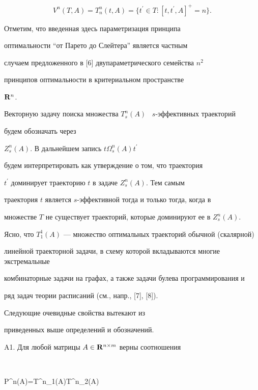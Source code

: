 $$


V^n(T,A)=T^n_n(t,A)=\{t^{\prime}\in T :[t,t^{\prime},A]^+=n\}.


$$





Отметим, что введенная здесь параметризация принципа


оптимальности ``от Парето до Слейтера'' является частным


случаем предложенного в [6] двупараметрического семейства $n^2$


принципов оптимальности в критериальном пространстве


$\bold{R}^n$.





Векторную задачу поиска множества $T^n_s(A)$ \ $s$-эффективных траекторий


будем обозначать через


$Z^n_s(A)$. В дальнейшем запись $t \Omega^n_s(A) t^{\prime}$


будем интерпретировать как утверждение о том, что траектория


$t^{\prime}$ доминирует траекторию $t$ в задаче $Z^n_s(A)$. Тем самым


траектория $t$ является $s$-эффективной тогда и только тогда, когда в


множестве $T$ не существует траекторий, которые доминируют ее в $Z^n_s(A)$.





Ясно, что $T^1_1(A)$ --- множество оптимальных траекторий обычной (скалярной)


линейной траекторной задачи, в схему которой вкладываются многие экстремальные


комбинаторные задачи на графах, а также задачи булева программирования и


ряд задач теории расписаний (см., напр., [7], [8]).





Следующие очевидные свойства вытекают из


приведенных выше определений и обозначений.





A1. Для любой матрицы $A\in\bold{R}^{n\times m}$ верны соотношения


$$


\emptyset\neq P^n(A)=T^n_1(A)\subseteq T^n_2(A) \subseteq \dotsb


